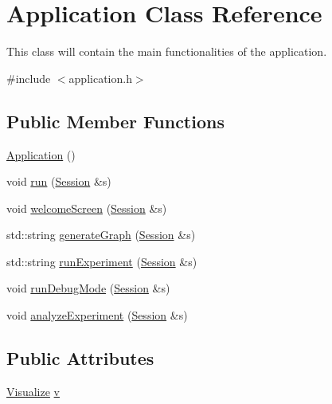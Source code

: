 \hypertarget{class_application}{}\section{Application Class Reference}
\label{class_application}


This class will contain the main functionalities of the application.  




{\ttfamily \#include $<$application.\+h$>$}

\subsection*{Public Member Functions}
\begin{DoxyCompactItemize}
\item 
\hyperlink{class_application_afa8cc05ce6b6092be5ecdfdae44e05f8}{Application} ()
\item 
void \hyperlink{class_application_adecc88549e44815bd94985ea043b733f}{run} (\hyperlink{struct_session}{Session} \&s)
\item 
void \hyperlink{class_application_abf73a60a6a2e4b83a675de777273d12c}{welcome\+Screen} (\hyperlink{struct_session}{Session} \&s)
\item 
std\+::string \hyperlink{class_application_a169c37596e9a7a9e0546700876adcbe7}{generate\+Graph} (\hyperlink{struct_session}{Session} \&s)
\item 
std\+::string \hyperlink{class_application_a1d9cfbea705655427e7d1847de2567c1}{run\+Experiment} (\hyperlink{struct_session}{Session} \&s)
\item 
void \hyperlink{class_application_adb639e3593f8f6f4dcb3d89d690eb538}{run\+Debug\+Mode} (\hyperlink{struct_session}{Session} \&s)
\item 
void \hyperlink{class_application_ae0d3919fe03bae0b3ce31ef4be49374d}{analyze\+Experiment} (\hyperlink{struct_session}{Session} \&s)
\end{DoxyCompactItemize}
\subsection*{Public Attributes}
\begin{DoxyCompactItemize}
\item 
\hyperlink{class_visualize}{Visualize} \hyperlink{class_application_a96cff2295a95d7e6de06638bb7e61243}{v}
\end{DoxyCompactItemize}


